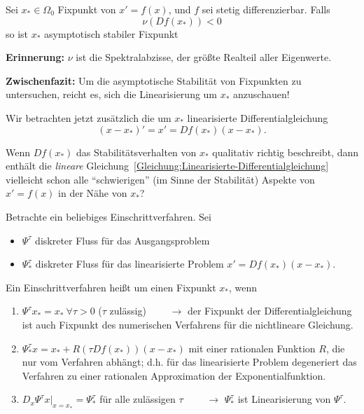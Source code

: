 \begin{satz}
	Sei $x_* \in \Omega_0$ Fixpunkt von $x' = f(x)$, und $f$ sei stetig differenzierbar. Falls
	\begin{equation*}
	\nu(Df(x_*)) < 0
	\end{equation*}
	so ist $x_*$ asymptotisch stabiler Fixpunkt
\end{satz}

\textbf{Erinnerung:} $\nu$ ist die Spektralabzisse, der größte Realteil aller Eigenwerte.

\textbf{Zwischenfazit:} Um die asymptotische Stabilität von Fixpunkten zu untersuchen, reicht es, sich die Linearisierung um $ x_* $ anzuschauen!

Wir betrachten jetzt zusätzlich die um $ x_* $ linearisierte Differentialgleichung
\begin{equation}\label{Gleichung:Linearisierte-Differentialgleichung}
(x-x_*)' = x' = Df(x_*)(x-x_*).
\end{equation}

\begin{idea}
	Wenn $Df(x_*)$ das Stabilitätsverhalten von $x_*$ qualitativ richtig beschreibt, dann enthält die \emph{lineare} Gleichung~\eqref{Gleichung:Linearisierte-Differentialgleichung}
	vielleicht schon alle \enquote{schwierigen} (im Sinne der Stabilität) Aspekte von $ x'=f(x)$ in der Nähe von $ x_* $?
\end{idea}

Betrachte ein beliebiges Einschrittverfahren. Sei
\begin{itemize}
	\item $\Psi^\tau$ diskreter Fluss für das Ausgangsproblem
	\item $\Psi_*^\tau$ diskreter Fluss für das linearisierte Problem $x'=Df(x_*)(x-x_*)$.
\end{itemize}

\begin{definition}
	Ein Einschrittverfahren heißt  um einen Fixpunkt $x_*$, wenn
	\begin{enumerate}
		\item $\Psi^\tau x_*=x_*\ \forall\tau>0$ ($\tau$ zulässig)
		$\qquad \rightarrow$ der Fixpunkt der Differentialgleichung ist auch
		Fixpunkt des numerischen Verfahrens für die nichtlineare Gleichung.
		
		\item $\Psi_*^\tau x = x_* + R(\tau Df(x_*))(x-x_*)$ mit einer rationalen Funktion $R$, die nur vom Verfahren abhängt; d.h. für das linearisierte Problem degeneriert das Verfahren zu einer rationalen Approximation der Exponentialfunktion.
		
		\item $D_x\Psi^\tau x\vert_{x=x_*}=\Psi^\tau_*$ für alle zulässigen $\tau$ $\qquad \rightarrow$ $\Psi^\tau_*$ ist Linearisierung von $\Psi^\tau$.
	\end{enumerate}
\end{definition}


